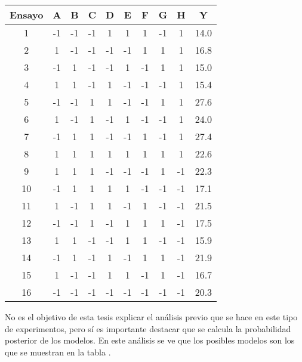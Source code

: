 \begin{center}
	\begin{tabular}{ccccccccc|c}
		Ensayo & A & B & C & D & E & F & G & H & Y \\
		\hline
		1 & -1 & -1 & -1 & 1 & 1 & 1 & -1 & 1 & 14.0 \\
		
		2 & 1 & -1 & -1 & -1 & -1 & 1 & 1 & 1 & 16.8 \\
		
		3 & -1 & 1 & -1 & -1 & 1 & -1 & 1 & 1 & 15.0 \\
		
		4 & 1 & 1 & -1 & 1 & -1 & -1 & -1 & 1 & 15.4 \\
		
		5 & -1 & -1 & 1 & 1 & -1 & -1 & 1 & 1 & 27.6 \\
		
		6 & 1 & -1 & 1 & -1 & 1 & -1 & -1 & 1 & 24.0 \\
		
		7 & -1 & 1 & 1 & -1 & -1 & 1 & -1 & 1 & 27.4 \\
		
		8 & 1 & 1 & 1 & 1 & 1 & 1 & 1 & 1 & 22.6 \\
		
		9 & 1 & 1 & 1 & -1 & -1 & -1 & 1 & -1 & 22.3 \\
		
		10 & -1 & 1 & 1 & 1 & 1 & -1 & -1 & -1 & 17.1 \\
		
		11 & 1 & -1 & 1 & 1 & -1 & 1 & -1 & -1 & 21.5 \\
		
		12 & -1 & -1 & 1 & -1 & 1 & 1 & 1 & -1 & 17.5 \\
		
		13 & 1 & 1 & -1 & -1 & 1 & 1 & -1 & -1 & 15.9 \\
		
		14 & -1 & 1 & -1 & 1 & -1 & 1 & 1 & -1 & 21.9 \\
		
		15 & 1 & -1 & -1 & 1 & 1 & -1 & 1 & -1 & 16.7 \\
		
		16 & -1 & -1 & -1 & -1 & -1 & -1 & -1 & -1 & 20.3 \\
		
	\end{tabular}
	 \label{data_table1}
\end{center}

No es el objetivo de esta tesis explicar el análisis previo que se hace en este tipo de experimentos, pero sí es importante destacar que se calcula la probabilidad posterior  de los modelos. En este análisis se ve que los posibles modelos son los que se muestran en la tabla \cite{modelos_prob_post}. 

